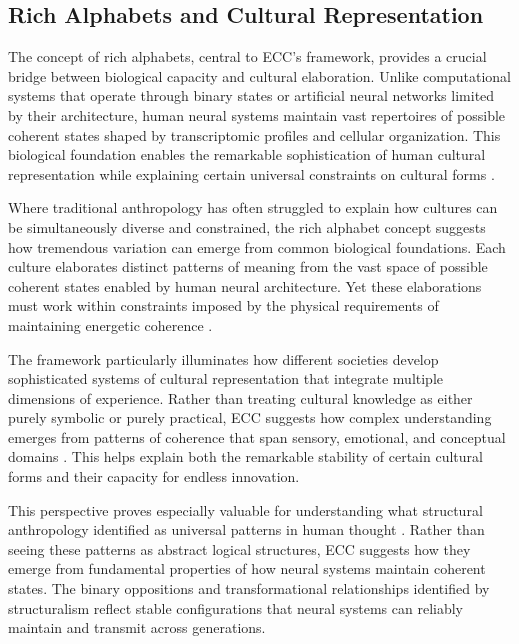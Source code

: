 \subsection{Rich Alphabets and Cultural Representation}

The concept of rich alphabets, central to ECC's framework, provides a crucial bridge between biological capacity and cultural elaboration. Unlike computational systems that operate through binary states or artificial neural networks limited by their architecture, human neural systems maintain vast repertoires of possible coherent states shaped by transcriptomic profiles and cellular organization. This biological foundation enables the remarkable sophistication of human cultural representation while explaining certain universal constraints on cultural forms \cite{shore1996culture}.

Where traditional anthropology has often struggled to explain how cultures can be simultaneously diverse and constrained, the rich alphabet concept suggests how tremendous variation can emerge from common biological foundations. Each culture elaborates distinct patterns of meaning from the vast space of possible coherent states enabled by human neural architecture. Yet these elaborations must work within constraints imposed by the physical requirements of maintaining energetic coherence \cite{wagner1981invention}.

The framework particularly illuminates how different societies develop sophisticated systems of cultural representation that integrate multiple dimensions of experience. Rather than treating cultural knowledge as either purely symbolic or purely practical, ECC suggests how complex understanding emerges from patterns of coherence that span sensory, emotional, and conceptual domains \cite{geertz1973interpretation}. This helps explain both the remarkable stability of certain cultural forms and their capacity for endless innovation.

This perspective proves especially valuable for understanding what structural anthropology identified as universal patterns in human thought \cite{levistrauss1963structural}. Rather than seeing these patterns as abstract logical structures, ECC suggests how they emerge from fundamental properties of how neural systems maintain coherent states. The binary oppositions and transformational relationships identified by structuralism reflect stable configurations that neural systems can reliably maintain and transmit across generations.

